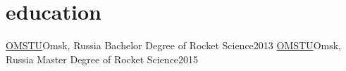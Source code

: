 \section{education}
  \resumeSubHeadingListStart

    \resumeSubheading
      {\href{https://omgtu.ru/}{OMSTU}}{Omsk, Russia}
      {Bachelor Degree of Rocket Science}{2013}
    \resumeSubheading
      {\href{https://omgtu.ru/}{OMSTU}}{Omsk, Russia}
      {Master Degree of Rocket Science}{2015}
      
  \resumeSubHeadingListEnd